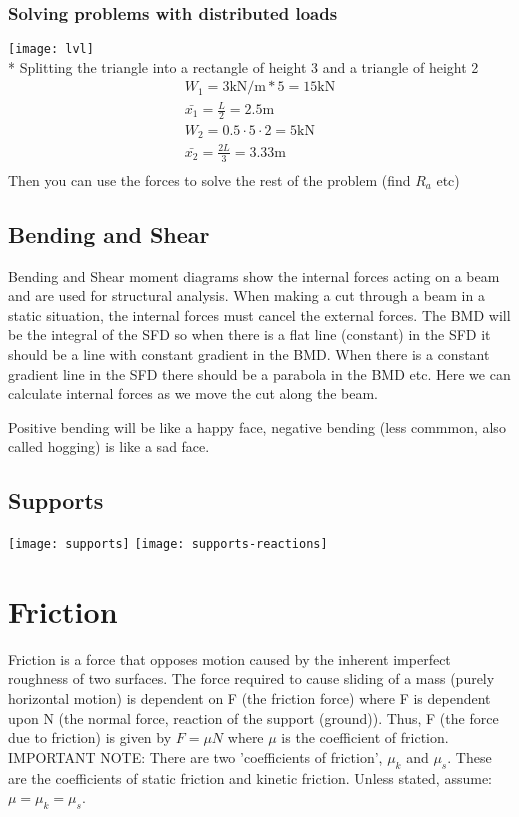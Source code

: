 \documentclass[a4paper, 12pt]{article}
\begin{document}
\subsubsection{Solving problems with distributed loads}
\texttt{[image: lvl]} \\*
Splitting the triangle into a rectangle of height 3 and a triangle of height 2 
\begin{align*}
    W_1 = 3 \text{kN/m} * 5 = 15\text{kN} \\
    \bar{x_1} = \frac{L}{2} = 2.5\text{m} \\
    W_2 = 0.5 \cdot 5 \cdot 2 = 5\text{kN} \\
    \bar{x_2} = \frac{2L}{3} = 3.33\text{m} \\
\end{align*}
Then you can use the forces to solve the rest of the problem (find $R_a$ etc)

\newpage 

\subsection{Bending and Shear}
Bending and Shear moment diagrams show the internal forces acting on a beam and are used
for structural analysis. When making a cut through a beam in a static situation, the 
internal forces must cancel the external forces. The BMD will be the integral of the SFD so
when there is a flat line (constant) in the SFD it should be a line with constant gradient in
the BMD. When there is a constant gradient line in the SFD there should be a parabola in the BMD etc.
Here we can calculate internal forces as we move the cut along the beam.

Positive bending will be like a happy face, negative bending (less commmon, also called hogging)
is like a sad face. 

\subsection{Supports}
\texttt{[image: supports]}
\texttt{[image: supports-reactions]}

\section{Friction} 
Friction is a force that opposes motion caused by the inherent imperfect roughness of two surfaces. 
The force required to cause sliding of a mass (purely horizontal motion) is dependent on F (the friction force)
where F is dependent upon N (the normal force, reaction of the support (ground)). Thus, F (the force due to friction) 
is given by $F=\mu N$ where $\mu$ is the coefficient of friction. IMPORTANT NOTE: There are two 'coefficients of friction', $\mu_k$ and $\mu_s$.
These are the coefficients of static friction and kinetic friction. Unless stated, assume: $\mu = \mu_k = \mu_s$.
\end{document}
